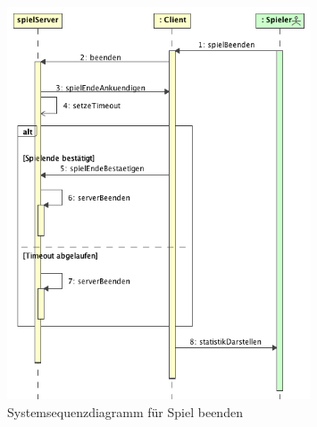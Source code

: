 \documentclass[12pt,halfparskip]{scrartcl}
\begin{document}
\begin{figure}
	[htp] \centering 
	\includegraphics[width=0.8\textwidth]{SSDSpielBeenden.png} \caption{Systemsequenzdiagramm für Spiel beenden}\label{fig:SSDSpielBeenden.png} 
\end{figure}
\end{document}
